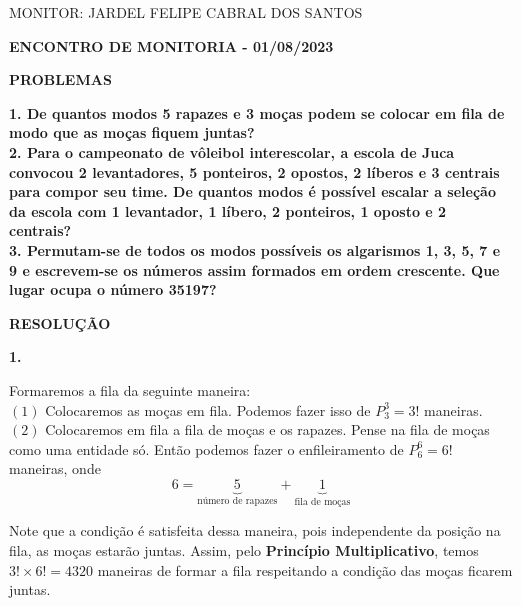 \documentclass[12pt, a4paper]{article}
\begin{document}
\begin{flushleft}

MONITOR: JARDEL FELIPE CABRAL DOS SANTOS\\[1cm] 
\end{flushleft}

\begin{center} \textbf{ENCONTRO DE MONITORIA - 01/08/2023\\[1cm]}
\end{center}

\begin{center}
\textbf{PROBLEMAS}
\end{center}

\textbf{1. De quantos modos 5 rapazes e 3 moças podem se colocar em fila de modo que as moças fiquem juntas?} \\

\textbf{2. Para o campeonato de vôleibol interescolar, a escola de Juca convocou 2 levantadores, 5 ponteiros, 2 opostos, 2 líberos e 3 centrais para compor seu time. De quantos modos é possível escalar a seleção da escola com 1 levantador, 1 líbero, 2 ponteiros, 1 oposto e 2 centrais?} \\

\textbf{3. Permutam-se de todos os modos possíveis os algarismos 1, 3, 5, 7 e 9 e escrevem-se os números assim formados em ordem crescente. Que lugar ocupa o número 35197?} \\

\begin{center}
\textbf{RESOLUÇÃO}
\end{center}

\textbf{1.}

Formaremos a fila da seguinte maneira: \\

\((1)\) Colocaremos as moças em fila. Podemos fazer isso de \(P_{3}^{3} = 3!\) maneiras. \\

\((2)\) Colocaremos em fila a fila de moças e os rapazes. Pense na fila de moças como uma entidade só. Então podemos fazer o enfileiramento de \(P_{6}^{6}=6!\) maneiras, onde \[6=\underbrace{5}_{\text{número de rapazes}}+\underbrace{1}_{\text{fila de moças}}\]

Note que a condição é satisfeita dessa maneira, pois independente da posição na fila, as moças estarão juntas. Assim, pelo \textbf{Princípio Multiplicativo}, temos \(3! \times 6!=4320\) maneiras de formar a fila respeitando a condição das moças ficarem juntas. \\
\end{document}
